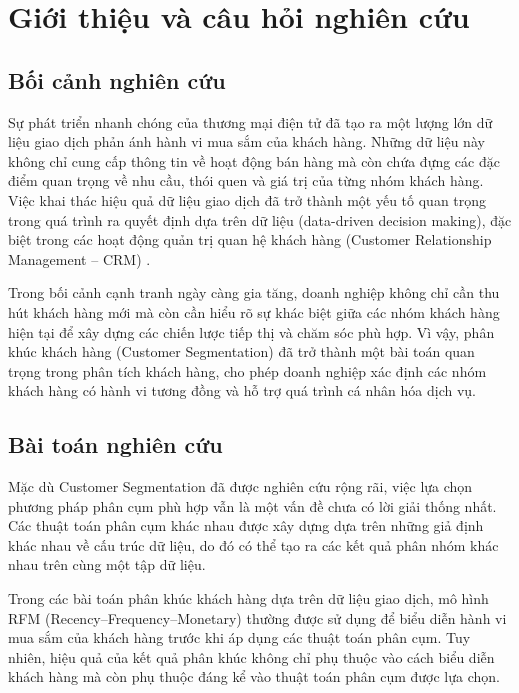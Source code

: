 \documentclass[12pt]{ai_conquer2026}
\begin{document}
\newpage
\setcounter{tocdepth}{1}
\tableofcontents
\thispagestyle{fancy}

\newpage
\section{Giới thiệu và câu hỏi nghiên cứu}

\subsection{Bối cảnh nghiên cứu}

Sự phát triển nhanh chóng của thương mại điện tử đã tạo ra một lượng lớn dữ liệu giao dịch phản ánh hành vi mua sắm của khách hàng. Những dữ liệu này không chỉ cung cấp thông tin về hoạt động bán hàng mà còn chứa đựng các đặc điểm quan trọng về nhu cầu, thói quen và giá trị của từng nhóm khách hàng. Việc khai thác hiệu quả dữ liệu giao dịch đã trở thành một yếu tố quan trọng trong quá trình ra quyết định dựa trên dữ liệu (data-driven decision making), đặc biệt trong các hoạt động quản trị quan hệ khách hàng (Customer Relationship Management -- CRM) \cite{Arunachalam2018,Gomes2023}.

Trong bối cảnh cạnh tranh ngày càng gia tăng, doanh nghiệp không chỉ cần thu hút khách hàng mới mà còn cần hiểu rõ sự khác biệt giữa các nhóm khách hàng hiện tại để xây dựng các chiến lược tiếp thị và chăm sóc phù hợp. Vì vậy, phân khúc khách hàng (Customer Segmentation) đã trở thành một bài toán quan trọng trong phân tích khách hàng, cho phép doanh nghiệp xác định các nhóm khách hàng có hành vi tương đồng và hỗ trợ quá trình cá nhân hóa dịch vụ.

\subsection{Bài toán nghiên cứu}

Mặc dù Customer Segmentation đã được nghiên cứu rộng rãi, việc lựa chọn phương pháp phân cụm phù hợp vẫn là một vấn đề chưa có lời giải thống nhất. Các thuật toán phân cụm khác nhau được xây dựng dựa trên những giả định khác nhau về cấu trúc dữ liệu, do đó có thể tạo ra các kết quả phân nhóm khác nhau trên cùng một tập dữ liệu.

Trong các bài toán phân khúc khách hàng dựa trên dữ liệu giao dịch, mô hình RFM (Recency--Frequency--Monetary) thường được sử dụng để biểu diễn hành vi mua sắm của khách hàng trước khi áp dụng các thuật toán phân cụm. Tuy nhiên, hiệu quả của kết quả phân khúc không chỉ phụ thuộc vào cách biểu diễn khách hàng mà còn phụ thuộc đáng kể vào thuật toán phân cụm được lựa chọn.
\end{document}
